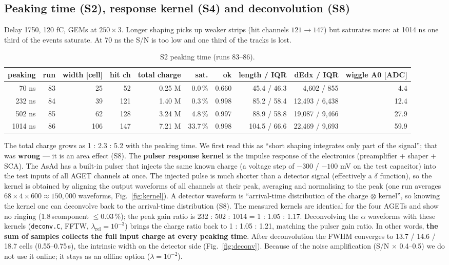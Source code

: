 \documentclass[a4paper,11pt]{article}
\newcommand{\us}{\,\textmu s}
\begin{document}
\subsection{Peaking time (S2), response kernel (S4) and deconvolution (S8)}
Delay 1750, 120 fC, GEMs at $250 \times 3$. Longer shaping picks up weaker strips (hit channels $121 \to 147$) but saturates more: at 1014 ns one third of the events saturate.
At 70 ns the S/N is too low and one third of the tracks is lost.

\begin{table}[h]\centering\small
\caption{S2 peaking time (runs 83--86).}
\footnotesize
\begin{tabular}{rrrrrrrrrr}
\toprule
peaking & run & width [cell] & hit ch & total charge & sat. & ok & length / IQR & dEdx / IQR & wiggle A0 [ADC] \\
\midrule
70 ns & 83 & 25 & 52 & 0.25 M & 0.0\,\% & 0.660 & 45.4 / 46.3 & 4,602 / 855 & 4.4 \\
232 ns & 84 & 39 & 121 & 1.40 M & 0.3\,\% & 0.998 & 85.2 / 58.4 & 12,493 / 6,438 & 12.4 \\
502 ns & 85 & 62 & 128 & 3.24 M & 4.8\,\% & 0.997 & 88.9 / 58.8 & 19,087 / 9,466 & 27.9 \\
1014 ns & 86 & 106 & 147 & 7.21 M & 33.7\,\% & 0.998 & 104.5 / 66.6 & 22,469 / 9,693 & 59.9 \\
\bottomrule
\end{tabular}
\end{table}

The total charge grows as 1 : 2.3 : 5.2 with the peaking time. We first read this as ``short shaping integrates only part of the signal''; that was \textbf{wrong} --- it is an area effect (S8).
The \textbf{pulser response kernel} is the impulse response of the electronics (preamplifier + shaper + SCA). The AsAd has a built-in pulser that injects the same known charge (a voltage step of $-300$ / $-100$ mV on the test capacitor) into the test inputs of all AGET channels at once. The injected pulse is much shorter than a detector signal (effectively a $\delta$ function), so the kernel is obtained by aligning the output waveforms of all channels at their peak, averaging and normalising to the peak (one run averages $68 \times 4 \times 600 \approx 150{,}000$ waveforms, Fig.~\ref{fig:kernel}). A detector waveform is ``arrival-time distribution of the charge $\otimes$ kernel'', so knowing the kernel one can deconvolve back to the arrival-time distribution (S8). The measured kernels are identical for the four AGETs and show no ringing (1.8\us component $\le 0.03$\,\%); the peak gain ratio is 232 : 502 : 1014 = 1 : 1.05 : 1.17.
Deconvolving the $\alpha$ waveforms with these kernels (\texttt{deconv.C}, FFTW, $\lambda_\mathrm{rel} = 10^{-3}$) brings the charge ratio back to 1 : 1.05 : 1.21, matching the pulser gain ratio.
In other words, \textbf{the sum of samples collects the full input charge at every peaking time}. After deconvolution the FWHM converges to 13.7 / 14.6 / 18.7 cells (0.55--0.75\us), the intrinsic width on the detector side (Fig.~\ref{fig:deconv}).
Because of the noise amplification (S/N $\times$ 0.4--0.5) we do not use it online; it stays as an offline option ($\lambda = 10^{-2}$).
\end{document}

